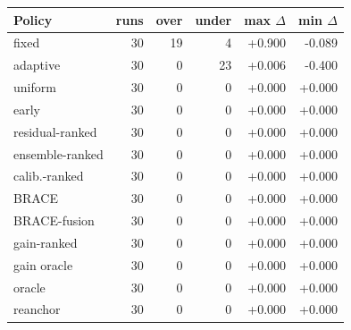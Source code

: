 \begin{tabular}{lrrrrr}
\toprule
Policy & runs & over & under & max $\Delta$ & min $\Delta$ \\
\midrule
fixed & 30 & 19 & 4 & +0.900 & -0.089 \\
adaptive & 30 & 0 & 23 & +0.006 & -0.400 \\
uniform & 30 & 0 & 0 & +0.000 & +0.000 \\
early & 30 & 0 & 0 & +0.000 & +0.000 \\
residual-ranked & 30 & 0 & 0 & +0.000 & +0.000 \\
ensemble-ranked & 30 & 0 & 0 & +0.000 & +0.000 \\
calib.-ranked & 30 & 0 & 0 & +0.000 & +0.000 \\
BRACE & 30 & 0 & 0 & +0.000 & +0.000 \\
BRACE-fusion & 30 & 0 & 0 & +0.000 & +0.000 \\
gain-ranked & 30 & 0 & 0 & +0.000 & +0.000 \\
gain oracle & 30 & 0 & 0 & +0.000 & +0.000 \\
oracle & 30 & 0 & 0 & +0.000 & +0.000 \\
reanchor & 30 & 0 & 0 & +0.000 & +0.000 \\
\bottomrule
\end{tabular}
